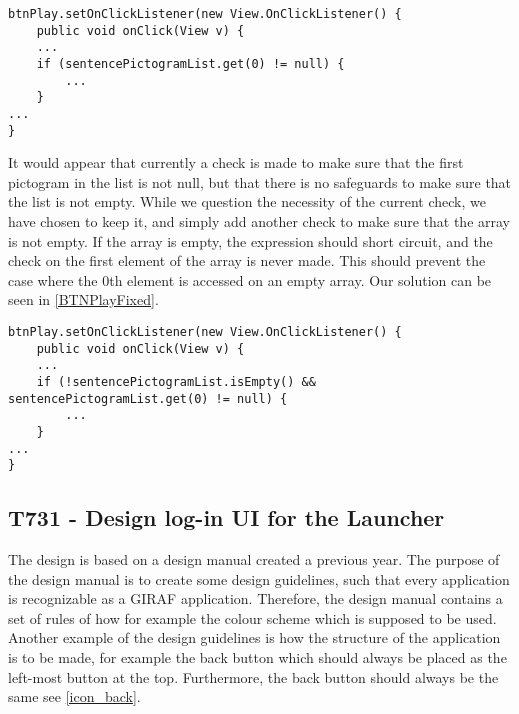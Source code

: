 \begin{minipage}[H]{\linewidth}
\begin{lstlisting}[caption = Accessing the 0th element of a null array., label = BTNPlay] 
btnPlay.setOnClickListener(new View.OnClickListener() {
	public void onClick(View v) {
	...
	if (sentencePictogramList.get(0) != null) {
		...
	}
...
}
\end{lstlisting}
\end{minipage}

It would appear that currently a check is made to make sure that the first
pictogram in the list is not null, but that there is no safeguards to make sure
that the list is not empty. While we question the necessity of the current
check, we have chosen to keep it, and simply add another check to make sure that
the array is not empty. If the array is empty, the expression should short
circuit, and the check on the first element of the array is never made. This
should prevent the case where the 0th element is accessed on an empty array. Our
solution can be seen in \autoref{BTNPlayFixed}.\nl

\begin{minipage}[H]{\linewidth}
\begin{lstlisting}[caption = Our solution to the presented problem., label = BTNPlayFixed] 
btnPlay.setOnClickListener(new View.OnClickListener() {
	public void onClick(View v) {
	...
	if (!sentencePictogramList.isEmpty() && sentencePictogramList.get(0) != null) {
		...
	}
...
}
\end{lstlisting}
\end{minipage}

\subsection{T731 - Design log-in UI for the Launcher}
The design is based on a design manual created a previous year. The purpose of
the design manual is to create some design guidelines, such that every
application is recognizable as a GIRAF application. Therefore, the design
manual contains a set of rules of how for example the colour scheme which is
supposed to be used. Another example of the design guidelines is how the
structure of the application is to be made, for example the back button which
should always be placed as the left-most button at the top. Furthermore, the
back button should always be the same see \autoref{icon_back}.


